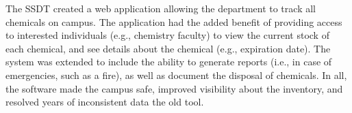 The SSDT created a web application allowing the department to track all chemicals on campus. The application had the added benefit of providing access to interested individuals (e.g., chemistry faculty) to view the current stock of each chemical, and see details about the chemical (e.g., expiration date). The system was extended to include the ability to generate reports (i.e., in case of emergencies, such as a fire), as well as document the disposal of chemicals. In all, the software made the campus safe, improved visibility about the inventory, and resolved years of inconsistent data the old tool.



